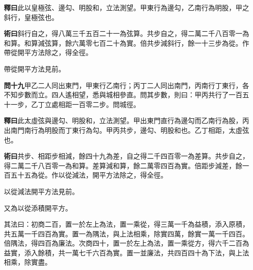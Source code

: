 \documentclass[12pt,a4paper]{article}
\begin{document}
\vspace{0.3em}

\noindent\textbf{釋曰}\quad 此以皇極弦、邊勾、明股和，立法測望。甲東行為邊勾，乙南行為明股，甲之斜行，皇極弦也。

\vspace{0.3em}

\noindent\textbf{術曰}\quad 斜行自之，得八萬三千五百二十一為弦算。共步自之，得二萬二千八百零一為和算。和算減弦算，餘六萬零七百二十為實。倍共步減斜行，餘一十三步為從。作帶從開平方法除之，得全徑。

\vspace{0.3em}

帶從開平方法見前。

\vspace{0.5em}

\noindent\textbf{問十九}\quad 甲乙二人同出東門，甲東行乙南行；丙丁二人同出南門，丙南行丁東行，各不知步數而立。四人遙相望，悉與城相參直。問其步數，則曰：甲丙共行了一百五十一步，乙丁立處相距一百零二步。問城徑。

\vspace{0.3em}

\noindent\textbf{釋曰}\quad 此太虛弦與邊勾、明股和，立法測望。甲出東門直行為邊勾而乙南行為股，丙出南門南行為明股而丁東行為勾。甲丙共步，邊勾、明股和也。乙丁相距，太虛弦也。

\vspace{0.3em}

\noindent\textbf{術曰}\quad 共步、相距步相減，餘四十九為差，自之得二千四百零一為差算。共步自之，得二萬二千八百零一為和算。差算減和算，餘二萬零四百為實。倍距步減差，餘一百五十五為從。作以從減法，開平方法除之，得全徑。

\vspace{0.3em}

以從減法開平方法見前。

\vspace{0.3em}

又為以從添積開平方。

\vspace{0.3em}

其法曰：初商二百，置一於左上為法，置一乘從，得三萬一千為益積，添入原積，共五萬一千四百為實。置一為隅法，與上法相乘，除實四萬，餘實一萬一千四百。倍隅法，得四百為廉法。次商四十，置一於左上為法，置一乘從方，得六千二百為益實，添入餘積，共一萬七千六百為實。置一並廉法，共四百四十為下法，與上法相乘，除實盡。

\vspace{0.3em}
\end{document}
